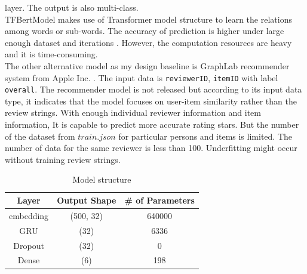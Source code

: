 \documentclass[12pt]{article}
\begin{document}
layer. The output is also multi-class.\\
TFBertModel makes use of Transformer model structure to learn the relations among words or sub-words.
The accuracy of prediction is higher under large enough dataset and iterations \cite{BERTpros}. 
However, the computation resources are heavy and it is time-consuming.\\
The other alternative model as my design baseline is GraphLab recommender system from Apple Inc. \cite{graph}. 
The input data is \texttt{reviewerID}, \texttt{itemID} with label \texttt{overall}. The recommender model is not
released but according to its input data type, it indicates
that the model focuses on user-item similarity rather than the review strings. 
With enough individual reviewer information and item information, It is capable to predict more accurate rating
stars. But the number of the dataset from $train.json$ for particular persons and items is limited. The number of
data for 
the same reviewer is less than 100. Underfitting might occur
without training review strings.
\begin{table}[h!]
    \centering
        \begin{tabular}{|c|c|c|}
        \hline
        Layer & Output Shape & \# of Parameters \\
        \hline 
        embedding & (500, 32) & 640000 \\
        \hline
        GRU &                   (32) &               6336 \\
        \hline
        Dropout &                   (32) &               0 \\
        \hline
        Dense  &               (6)     &            198  \\
        \hline
        \end{tabular}
    \caption{Model structure}
    \label{table:ms}
\end{table}
\end{document}
